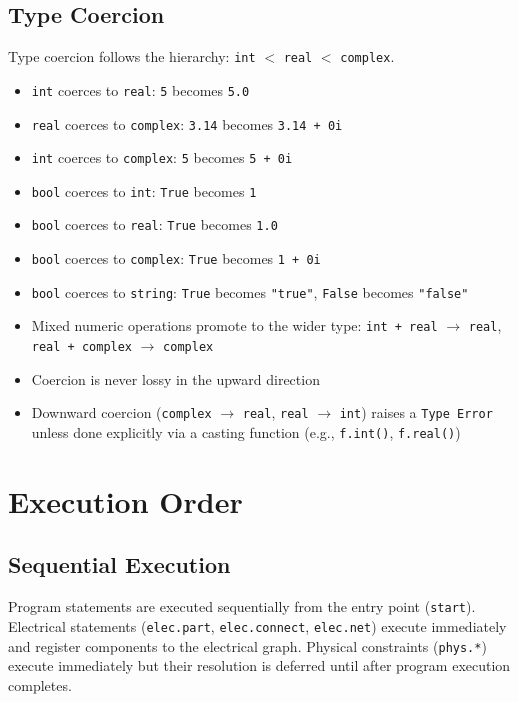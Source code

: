 \section{Type Coercion}
Type coercion follows the hierarchy: \texttt{int} $<$ \texttt{real} $<$ \texttt{complex}.
\begin{itemize}
\item \texttt{int} coerces to \texttt{real}: \texttt{5} becomes \texttt{5.0}
\item \texttt{real} coerces to \texttt{complex}: \texttt{3.14} becomes \texttt{3.14 + 0i}
\item \texttt{int} coerces to \texttt{complex}: \texttt{5} becomes \texttt{5 + 0i}
\item \texttt{bool} coerces to \texttt{int}: \texttt{True} becomes \texttt{1}
\item \texttt{bool} coerces to \texttt{real}: \texttt{True} becomes \texttt{1.0}
\item \texttt{bool} coerces to \texttt{complex}: \texttt{True} becomes \texttt{1 + 0i}
\item \texttt{bool} coerces to \texttt{string}: \texttt{True} becomes \texttt{"true"}, \texttt{False} becomes \texttt{"false"}
\item Mixed numeric operations promote to the wider type: \texttt{int + real} $\rightarrow$ \texttt{real}, \texttt{real + complex} $\rightarrow$ \texttt{complex}
\item Coercion is never lossy in the upward direction
\item Downward coercion (\texttt{complex} $\rightarrow$ \texttt{real}, \texttt{real} $\rightarrow$ \texttt{int}) raises a \texttt{Type Error} unless done explicitly via a casting function (e.g., \texttt{f.int()}, \texttt{f.real()})
\end{itemize}


\chapter{Execution Order}  %

\section{Sequential Execution}
Program statements are executed sequentially from the entry point (\texttt{start}). Electrical statements (\texttt{elec.part}, \texttt{elec.connect}, \texttt{elec.net}) execute immediately and register components to the electrical graph. Physical constraints (\texttt{phys.*}) execute immediately but their resolution is deferred until after program execution completes.

